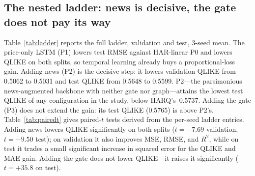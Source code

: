 \documentclass[runningheads]{llncs}
\newcommand{\PoneTestQ}{0.5648}  %
\newcommand{\PtwoTestQ}{0.5599}  %
\newcommand{\PthreeTestQ}{0.5765}%
\newcommand{\PoneValQ}{0.5062}   %
\newcommand{\PtwoValQ}{0.5031}   %
\newcommand{\HARQtestQ}{0.5737}  %
\newcommand{\newsValT}{-7.69}
\newcommand{\newsTestT}{-9.50}
\newcommand{\gateTestT}{+35.8}
\newcommand{\nseed}{3}
\begin{document}
\subsection{The nested ladder: news is decisive, the gate does not pay its way}
\label{sec:ladder}
Table~\ref{tab:ladder} reports the full ladder, validation and test, \nseed-seed mean. The price-only LSTM
(P1) lowers test RMSE against HAR-linear P0 and lowers QLIKE on both splits, so temporal learning already
buys a proportional-loss gain. Adding news (P2) is the decisive step: it lowers validation QLIKE from
\PoneValQ{} to \PtwoValQ{} and test QLIKE from \PoneTestQ{} to \PtwoTestQ. P2---the parsimonious
news-augmented backbone with neither gate nor graph---attains the lowest test QLIKE of any configuration
in the study, below HARQ's~\HARQtestQ. Adding the gate (P3) does not extend the gain: its test QLIKE
(\PthreeTestQ) is above P2's. Table~\ref{tab:pairedt} gives paired-$t$ tests derived from the per-seed
ladder entries. Adding news lowers QLIKE significantly on both splits ($t=\newsValT$ validation,
$t=\newsTestT$ test); on validation it also improves MSE, RMSE, and $R^2$, while on test it trades a small
significant increase in squared error for the QLIKE and MAE gain. Adding the gate does not lower QLIKE---it
raises it significantly ($t=\gateTestT$ on test).
\end{document}
